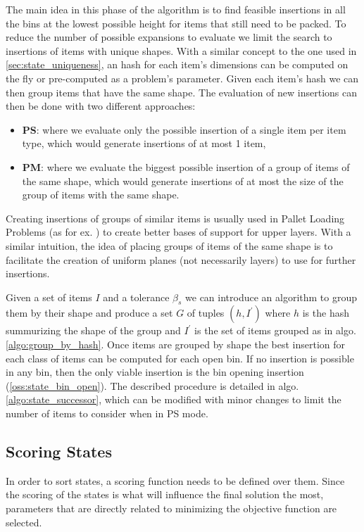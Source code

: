 The main idea in this phase of the algorithm is to find feasible insertions in all the bins at the lowest possible height for items that still need to be packed.
To reduce the number of possible expansions to evaluate we limit the search to insertions of items with unique shapes.
With a similar concept to the one used in \cref{sec:state_uniqueness}, an hash for each item's dimensions can be computed on the fly or pre-computed as a problem's parameter.
Given each item's hash we can then group items that have the same shape.
The evaluation of new insertions can then be done with two different approaches:
\begin{itemize}
    \label{def:placement_modes}%
    \item \textbf{PS}: where we evaluate only the possible insertion of a single item per item type, which would generate insertions of at most 1 item,
    \item \textbf{PM}: where we evaluate the biggest possible insertion of a group of items of the same shape, which would generate insertions of at most the size of the group of items with the same shape.
\end{itemize}
Creating insertions of groups of similar items is usually used in Pallet Loading Problems (as for ex. \cite{elhedhli2019three}) to create better bases of support for upper layers.
With a similar intuition, the idea of placing groups of items of the same shape is to facilitate the creation of uniform planes (not necessarily layers) to use for further insertions.

Given a set of items $I$ and a tolerance $\beta_s$ we can introduce an algorithm to group them by their shape and produce a set $G$ of tuples $(h, I^\prime)$ where $h$ is the hash summurizing the shape of the group and $I^\prime$ is the set of items grouped as in algo. \ref{algo:group_by_hash}.
Once items are grouped by shape the best insertion for each class of items can be computed for each open bin. If no insertion is possible in any bin, then the only viable insertion is the bin opening insertion (\cref{oss:state_bin_open}).
The described procedure is detailed in algo. \ref{algo:state_successor}, which can be modified with minor changes to limit the number of items to consider when in PS mode.





\subsection{Scoring States}
\label{ssec:scoring_states}%
In order to sort states, a scoring function needs to be defined over them.
Since the scoring of the states is what will influence the final solution the most, parameters that are directly related to minimizing the objective function are selected.

